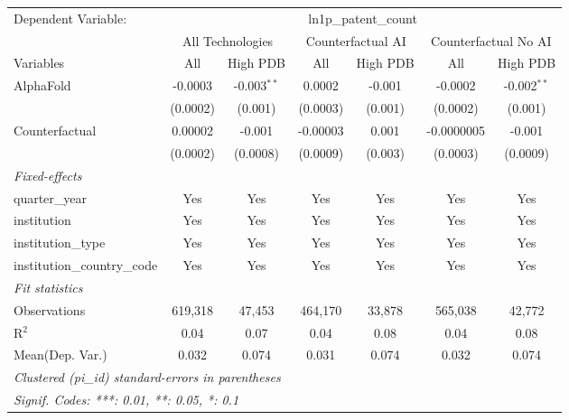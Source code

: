 \begingroup
\centering
\begin{tabular}{lcccccc}
   \tabularnewline \midrule \midrule
   Dependent Variable: & \multicolumn{6}{c}{ln1p\_patent\_count}\\
 & \multicolumn{2}{c}{All Technologies} & \multicolumn{2}{c}{Counterfactual AI} & \multicolumn{2}{c}{Counterfactual No AI} \\
\cmidrule(lr){1-1}\cmidrule(lr){2-3} \cmidrule(lr){4-5} \cmidrule(lr){6-7}
Variables & \multicolumn{1}{c}{All} & \multicolumn{1}{c}{High PDB} & \multicolumn{1}{c}{All} & \multicolumn{1}{c}{High PDB} & \multicolumn{1}{c}{All} & \multicolumn{1}{c}{High PDB} \\
\cmidrule(lr){1-1}\cmidrule(lr){2-2} \cmidrule(lr){3-3} \cmidrule(lr){4-4} \cmidrule(lr){5-5} \cmidrule(lr){6-6} \cmidrule(lr){7-7}
   AlphaFold                    & -0.0003  & -0.003$^{**}$ & 0.0002   & -0.001  & -0.0002    & -0.002$^{**}$\\   
                                & (0.0002) & (0.001)       & (0.0003) & (0.001) & (0.0002)   & (0.001)\\   
   Counterfactual               & 0.00002  & -0.001        & -0.00003 & 0.001   & -0.0000005 & -0.001\\   
                                & (0.0002) & (0.0008)      & (0.0009) & (0.003) & (0.0003)   & (0.0009)\\   
   \midrule
   \emph{Fixed-effects}\\
   quarter\_year                & Yes      & Yes           & Yes      & Yes     & Yes        & Yes\\  
   institution                  & Yes      & Yes           & Yes      & Yes     & Yes        & Yes\\  
   institution\_type            & Yes      & Yes           & Yes      & Yes     & Yes        & Yes\\  
   institution\_country\_code   & Yes      & Yes           & Yes      & Yes     & Yes        & Yes\\  
   \midrule
   \emph{Fit statistics}\\
   Observations                 & 619,318  & 47,453        & 464,170  & 33,878  & 565,038    & 42,772\\  
   R$^2$                        & 0.04     & 0.07          & 0.04     & 0.08    & 0.04       & 0.08\\  
Mean(Dep. Var.) & 0.032 & 0.074 & 0.031 & 0.074 & 0.032 & 0.074 \\
   \midrule \midrule
   \multicolumn{7}{l}{\emph{Clustered (pi\_id) standard-errors in parentheses}}\\
   \multicolumn{7}{l}{\emph{Signif. Codes: ***: 0.01, **: 0.05, *: 0.1}}\\
\end{tabular}
\par\endgroup
